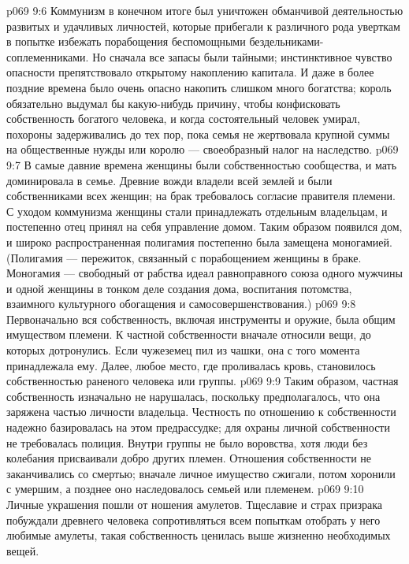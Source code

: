 \vs p069 9:6 \pc {}\bibnobreakspace {} Коммунизм в конечном итоге был уничтожен обманчивой деятельностью развитых и удачливых личностей, которые прибегали к различного рода уверткам в попытке избежать порабощения беспомощными бездельниками\hyp{}соплеменниками. Но сначала все запасы были тайными; инстинктивное чувство опасности препятствовало открытому накоплению капитала. И даже в более поздние времена было очень опасно накопить слишком много богатства; король обязательно выдумал бы какую\hyp{}нибудь причину, чтобы конфисковать собственность богатого человека, и когда состоятельный человек умирал, похороны задерживались до тех пор, пока семья не жертвовала крупной суммы на общественные нужды или королю --- своеобразный налог на наследство.
\vs p069 9:7 В самые давние времена женщины были собственностью сообщества, и мать доминировала в семье. Древние вожди владели всей землей и были собственниками всех женщин; на брак требовалось согласие правителя племени. С уходом коммунизма женщины стали принадлежать отдельным владельцам, и постепенно отец принял на себя управление домом. Таким образом появился дом, и широко распространенная полигамия постепенно была замещена моногамией. (Полигамия --- пережиток, связанный с порабощением женщины в браке. Моногамия --- свободный от рабства идеал равноправного союза одного мужчины и одной женщины в тонком деле создания дома, воспитания потомства, взаимного культурного обогащения и самосовершенствования.)
\vs p069 9:8 Первоначально вся собственность, включая инструменты и оружие, была общим имуществом племени. К частной собственности вначале относили вещи, до которых дотронулись. Если чужеземец пил из чашки, она с того момента принадлежала ему. Далее, любое место, где проливалась кровь, становилось собственностью раненого человека или группы.
\vs p069 9:9 Таким образом, частная собственность изначально не нарушалась, поскольку предполагалось, что она заряжена частью личности владельца. Честность по отношению к собственности надежно базировалась на этом предрассудке; для охраны личной собственности не требовалась полиция. Внутри группы не было воровства, хотя люди без колебания присваивали добро других племен. Отношения собственности не заканчивались со смертью; вначале личное имущество сжигали, потом хоронили с умершим, а позднее оно наследовалось семьей или племенем.
\vs p069 9:10 Личные украшения пошли от ношения амулетов. Тщеславие и страх призрака побуждали древнего человека сопротивляться всем попыткам отобрать у него любимые амулеты, такая собственность ценилась выше жизненно необходимых вещей.

